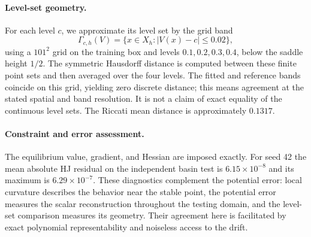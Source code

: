 \documentclass[11pt]{article}
\theoremstyle{plain}      %
\theoremstyle{definition} %
\begin{document}
\paragraph{Level-set geometry.}
For each level $c$, we approximate its level set by the grid band
\[
 \Gamma_{c,h}(V)=\{x\in X_h:|V(x)-c|\leq0.02\},
\]
using a $101^2$ grid on the training box and levels $0.1,0.2,0.3,0.4$, below the saddle height $1/2$. The symmetric Hausdorff distance is computed between these finite point sets and then averaged over the four levels. The fitted and reference bands coincide on this grid, yielding zero discrete distance; this means agreement at the stated spatial and band resolution. It is not a claim of exact equality of the continuous level sets. The Riccati mean distance is approximately $0.1317$.

\paragraph{Constraint and error assessment.}
The equilibrium value, gradient, and Hessian are imposed exactly. For seed 42 the mean absolute HJ residual on the independent basin test is $6.15\times10^{-8}$ and its maximum is $6.29\times10^{-7}$. These diagnostics complement the potential error: local curvature describes the behavior near the stable point, the potential error measures the scalar reconstruction throughout the testing domain, and the level-set comparison measures its geometry. Their agreement here is facilitated by exact polynomial representability and noiseless access to the drift.
\end{document}
